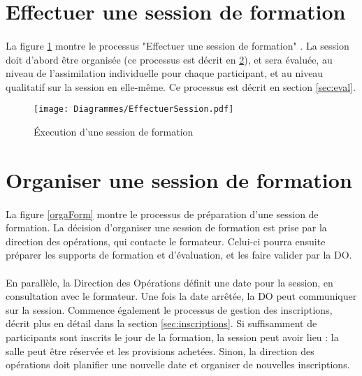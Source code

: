 \section{Effectuer une session de formation}
\paragraph{} La figure \ref{effSession} montre le processus "Effectuer une session de formation" . La session doit d'abord être organisée (ce processus est décrit en \ref{sec:Orga}), et sera évaluée, au niveau de l'assimilation individuelle pour chaque participant, et au niveau qualitatif sur la session en elle-même. Ce processus est décrit en section \ref{sec:eval}.

\begin{figure}[H]
	\centering
\begin{sideways}
	\texttt{[image: Diagrammes/EffectuerSession.pdf]}
\end{sideways}
	\caption{Éxecution d'une session de formation} 
	\label{effSession}
\end{figure}
 	



\section{Organiser une session de formation}
\label{sec:Orga}

\paragraph{}La figure \ref{orgaForm} montre le processus de préparation d'une session de formation. La décision d'organiser une session de formation est prise par la direction des opérations, qui contacte le formateur. Celui-ci pourra ensuite préparer les supports de formation et d'évaluation, et les faire valider par la DO.
\paragraph{} En parallèle, la Direction des Opérations définit une date pour la session, en consultation avec le formateur. Une fois la date arrêtée, la DO peut communiquer sur la session. Commence également le processus de gestion des inscriptions, décrit plus en détail dans la section \ref{sec:inscriptions}. Si suffisamment de participants sont inscrits le jour de la formation, la session peut avoir lieu : la salle peut être réservée et les provisions achetées. Sinon, la direction des opérations doit planifier une nouvelle date et organiser de nouvelles inscriptions.
